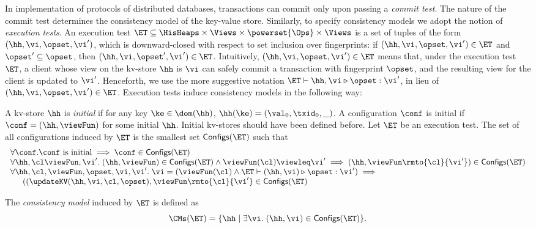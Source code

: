In implementation of protocols of distributed databases, transactions can 
commit only upon passing a \emph{commit test}. 
The nature of the commit test determines the consistency model of 
the key-value store.
Similarly, to specify consistency models we adopt the notion of 
\emph{execution tests}. An execution test 
$\ET \subseteq \HisHeaps \times \Views \times \powerset{\Ops} \times \Views$ 
is a set of tuples of the form $(\hh, \vi, \opset, \vi')$, 
which is downward-closed with respect to set inclusion over fingerprints: 
if $(\hh, \vi, \opset, \vi') \in \ET$ and $\opset' \subseteq \opset$, then 
$(\hh, \vi, \opset', \vi') \in \ET$.
Intuitively, 
$(\hh, \vi, \opset, \vi') \in \ET$ means that, under the execution test 
$\ET$, a client whose view on the kv-store $\hh$ is $\vi$ can safely 
commit a transaction with fingerprint $\opset$, and the resulting 
view for the client is updated to $\vi'$. Henceforth, we use the more 
suggestive notation $\ET \vdash \hh, \vi \triangleright \opset : \vi'$, 
in lieu of $(\hh, \vi, \opset, \vi') \in \ET$.
Execution tests induce consistency models in the following way: 
\begin{definition}
\label{def:cm}
A kv-store $\hh$ is \emph{initial} if for any key $\ke \in \dom(\hh)$, 
$\hh(\ke) = (\val_0, \txid_0, \_)$. A configuration $\conf$ is 
initial  if $\conf = (\hh, \viewFun)$ for some initial $\hh$.
\ac{Initial kv-stores should have been defined before.}
Let $\ET$ be an execution test. The set of all configurations 
induced by $\ET$ is the smallest set $\mathsf{Configs}(\ET)$ 
such that 
\[
\begin{array}{l}
\forall \conf. \conf \text{ is initial} \implies \conf \in \mathsf{Configs}(\ET)\\
\forall \hh, \cl \viewFun,\vi'.\; (\hh, \viewFun) \in \mathsf{Configs}(\ET) \wedge \viewFun(\cl) \viewleq \vi' \implies (\hh, \viewFun\rmto{\cl}{\vi'}) \in \mathsf{Configs}(\ET)\\
\forall \hh, \cl, \viewFun, \opset, \vi, \vi'.\; \vi = (\viewFun(\cl) \wedge \ET \vdash (\hh, \vi) \triangleright \opset : \vi') \implies {}\\
\hspace{15pt}
((\updateKV(\hh, \vi, \cl, \opset), \viewFun\rmto{\cl}{\vi'} \in \mathsf{Configs}(\ET) 
\end{array}
\]

The \emph{consistency model} induced by $\ET$ is defined as 
\[
\CMs(\ET) = \{ \hh \mid \exists \vi.\; (\hh, \vi) \in \mathsf{Configs}(\ET) \}.
\]
\end{definition}

